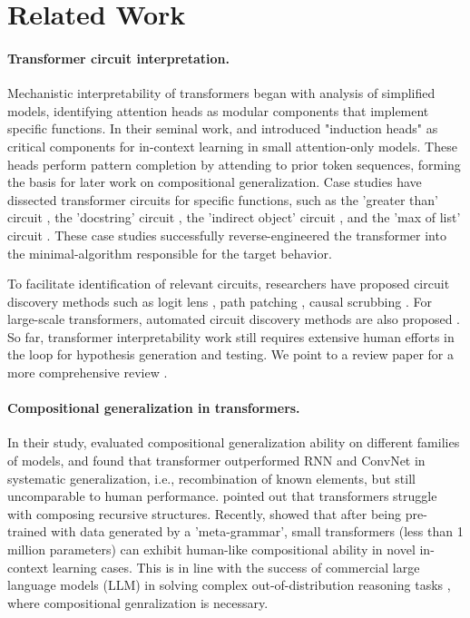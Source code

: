 \section{Related Work}
\label{appendix0}




\paragraph{Transformer circuit interpretation.}
Mechanistic interpretability of transformers began with analysis of simplified models, identifying attention heads as modular components that implement specific functions. In their seminal work, \citet{Elhage2021-vq} and \citet{Olsson2022-hk} introduced "induction heads" as critical components for in-context learning in small attention-only models. These heads perform pattern completion by attending to prior token sequences, forming the basis for later work on compositional generalization. Case studies have dissected transformer circuits for specific functions, such as the 'greater than' circuit \citep{Hanna2023-zy}, the 'docstring' circuit \citep{Heimersheim2023-ka}, the 'indirect object' circuit \citep{Wang2024-vp}, and the 'max of list' circuit \citep{Hofstatter2023-rv}. These case studies successfully reverse-engineered the transformer into the minimal-algorithm responsible for the target behavior.

To facilitate identification of relevant circuits, researchers have proposed circuit discovery methods such as logit lens \citep{nostalgebraist2020-du}, path patching \citep{Goldowsky-Dill2023-zr}, causal scrubbing \cite{LawrenceC2022-zy}.   For large-scale transformers, automated circuit discovery methods are also proposed \citep{Conmy2023-ej, Hsu2024-xo, Bhaskar2024-mn}. So far, transformer interpretability work still requires extensive human efforts in the loop for hypothesis generation and testing. We point to a review paper for a more comprehensive review \citep{Rai2024-yg}.

\paragraph{Compositional generalization in transformers.} In their study, \citet{Hupkes2019-qi} evaluated compositional generalization ability on different families of models, and found that transformer outperformed RNN and ConvNet in systematic generalization, i.e., recombination of known elements, but still uncomparable to human performance.  \citet{Zhang2024-yl} pointed out that transformers struggle with composing recursive structures. Recently, \citet{Lake2023-cp} showed that after being pre-trained with data generated by a 'meta-grammar', small transformers (less than 1 million parameters) can exhibit human-like compositional ability in novel in-context learning cases. This is in line with the success of commercial large language models (LLM) in solving complex out-of-distribution reasoning tasks \citep{Bubeck2023-ho,DeepSeek-AI2024-bs}, where compositional genralization is necessary. 

